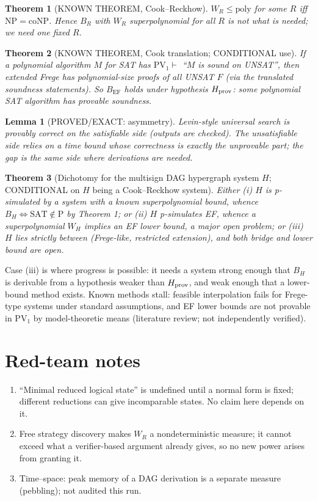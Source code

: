 \documentclass{article}
\newtheorem{thm}{Theorem}\newtheorem{lem}{Lemma}
\begin{document}
\begin{thm}[KNOWN THEOREM, Cook--Reckhow]
$W_R\le\mathrm{poly}$ for some $R$ iff $\mathrm{NP}=\mathrm{coNP}$. Hence $B_R$ with $W_R$ superpolynomial for \emph{all} $R$ is not what is needed; we need one fixed $R$.
\end{thm}
\begin{thm}[KNOWN THEOREM, Cook translation; CONDITIONAL use]
If a polynomial algorithm $M$ for SAT has $\mathrm{PV}_1\vdash$ ``$M$ is sound on UNSAT'', then extended Frege has polynomial-size proofs of all UNSAT $F$ (via the translated soundness statements). So $B_{\mathrm{EF}}$ holds under hypothesis $H_{\rm prov}$: some polynomial SAT algorithm has provable soundness.
\end{thm}
\begin{lem}[PROVED/EXACT: asymmetry]
Levin-style universal search is provably correct on the satisfiable side (outputs are checked). The unsatisfiable side relies on a time bound whose correctness is exactly the unprovable part; the gap is the same side where derivations are needed.
\end{lem}
\begin{thm}[Dichotomy for the multisign DAG hypergraph system $H$; CONDITIONAL on $H$ being a Cook--Reckhow system]
Either (i) $H$ is p-simulated by a system with a known superpolynomial bound, whence $B_H\iff \mathrm{SAT}\notin\mathrm P$ by Theorem 1; or (ii) $H$ p-simulates EF, whence a superpolynomial $W_H$ implies an EF lower bound, a major open problem; or (iii) $H$ lies strictly between (Frege-like, restricted extension), and both bridge and lower bound are open.
\end{thm}
\noindent Case (iii) is where progress is possible: it needs a system strong enough that $B_H$ is derivable from a hypothesis weaker than $H_{\rm prov}$, and weak enough that a lower-bound method exists. Known methods stall: feasible interpolation fails for Frege-type systems under standard assumptions, and EF lower bounds are not provable in $\mathrm{PV}_1$ by model-theoretic means (literature review; not independently verified).

\section*{Red-team notes}
\begin{enumerate}
\item ``Minimal reduced logical state'' is undefined until a normal form is fixed; different reductions can give incomparable states. No claim here depends on it.
\item Free strategy discovery makes $W_R$ a nondeterministic measure; it cannot exceed what a verifier-based argument already gives, so no new power arises from granting it.
\item Time--space: peak memory of a DAG derivation is a separate measure (pebbling); not audited this run.
\end{enumerate}
\end{document}
